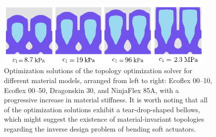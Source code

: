 \begin{figure}[!t]
  \centering
  \includegraphics*[width=0.95\textwidth]{./pdf/thesis-fig-31.pdf}
  \caption{Optimization solutions of the topology optimization solver for different material models, arranged from left to right: Ecoflex 00--10, Ecoflex 00--50, Dragonskin 30, and NinjaFlex 85A, with a progressive increase in material stiffness. It is worth noting that all of the optimization solutions exhibit a tear-drop-shaped bellows, which might suggest the existence of material-invariant topologies regarding the inverse design problem of bending soft actuators.}
  \label{fig:topo_result_different}\end{figure}